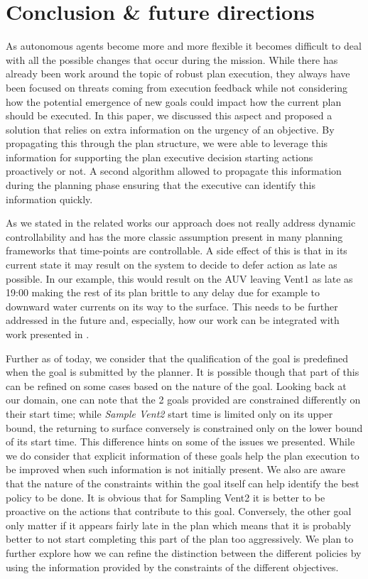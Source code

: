 \section{Conclusion \& future directions}
\label{sec:conclude}

As autonomous agents become more and more flexible it becomes difficult
to deal with all the possible changes that occur during the
mission. While there has already been work around the topic of robust
plan execution, they always have been focused on threats coming from
execution feedback while not considering how the potential emergence of
new goals could impact how the current plan should be executed. In this
paper, we discussed this aspect and proposed a solution that relies on
extra information on the urgency of an objective. By propagating this
through the plan structure, we were able to leverage this information for
supporting the plan executive decision starting actions proactively or
not. A second algorithm allowed to propagate this information during the
planning phase ensuring that the executive can identify this information
quickly.

 As we stated in the related works our approach does not
really address dynamic controllability and has the more classic
assumption present in many planning frameworks that time-points are
controllable. A side effect of this is that in its current state it may
result on the system to decide to defer action as late as possible. In
our example, this would result on the AUV leaving Vent1 as late
as 19:00 making the rest of its plan brittle to any delay due for
example to downward water currents on its way to the surface. This needs to be further
addressed in the future and, especially, how our work can be integrated
with work presented in \cite{morris01}.

Further as of today, we consider that the qualification of the goal is
predefined when the goal is submitted by the planner. It is possible
though that part of this can be refined on some cases based on the
nature of the goal. Looking back at our domain, one can note that the 2
goals provided are constrained differently on their start time; while
{\em Sample Vent2} start time is limited only on its upper bound, the
returning to surface conversely is constrained only on the lower bound of
its start time. This difference hints on some of the issues we
presented. While we do consider that explicit information of these goals
help the plan execution to be improved when such information is not
initially present. We also are aware that the nature of the constraints
within the goal itself can help identify the best policy to be done. It
is obvious that for Sampling Vent2 it is better to be
proactive on the actions that contribute to this goal. Conversely, the
other goal only matter if it appears fairly late in the plan which means
that it is probably better to not start completing this part of the
plan too aggressively. We plan to further explore how we can refine the
distinction between the different policies by using the information
provided by the constraints of the different objectives.
 
